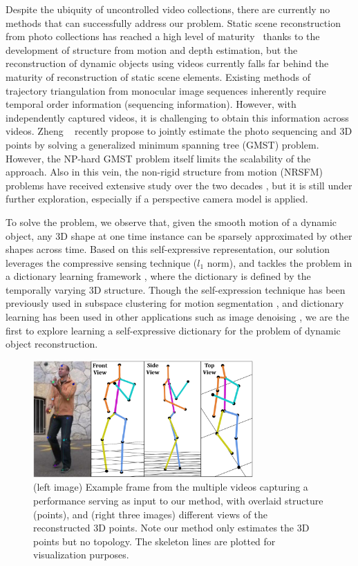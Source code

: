 Despite the ubiquity of uncontrolled video collections, there are currently no methods that can successfully address our problem.
Static scene reconstruction from photo collections has reached a high level of maturity~\cite{Snavely2,zheng2014patchmatch,Heinly} thanks to the development of structure from motion and depth estimation, but the reconstruction of dynamic objects using videos currently falls far behind the maturity of reconstruction of static scene elements. Existing methods of trajectory triangulation \cite{Park_ECCV2010, Valmadre_CVPR2012} from monocular image sequences inherently require temporal order information (sequencing information).
However, with independently captured videos, it is challenging to obtain this  information across videos. Zheng \etal~\cite{zheng2014joint} recently propose to jointly estimate the photo sequencing and 3D points by solving a generalized minimum spanning tree (GMST) problem. However, the NP-hard GMST problem itself limits the scalability of the approach. Also in this vein, the non-rigid structure from motion (NRSFM) problems have received extensive study over the two decades \cite{Tomasi_IJCV92,hartley2008perspective,dai2014simple}, but it is still under further exploration, especially if a perspective camera model is applied. 

To solve the problem, we observe that,
given the smooth motion of a dynamic object, any 3D shape at one time instance can be sparsely approximated by other shapes across time. 
Based on this self-expressive representation, our solution leverages the compressive sensing technique ($l_1$ norm), and tackles the problem in a dictionary learning framework \cite{aharon2006img,elad2006image}, where the dictionary is defined by the temporally varying 3D structure. Though the self-expression technique has been previously used in subspace clustering for motion segmentation \cite{elhamifar2009sparse}, and dictionary learning has been used in other applications such as image denoising \cite{elad2006image}, we are the first to explore learning a self-expressive dictionary for the problem of dynamic object reconstruction. 

\begin{figure}
\centering
\includegraphics[width=0.75\textwidth]{chapter5/resource/first_image_cropped.pdf}
\caption[Example output of the reconstructed 3D points.]{\label{fig:first_image}(left image) Example frame from the multiple videos capturing a performance serving as input to our method, with overlaid structure (points), and (right three images) different views of the reconstructed 3D points. Note our method only estimates the 3D points but no topology. The skeleton lines are plotted  for visualization purposes.}
\end{figure} 

